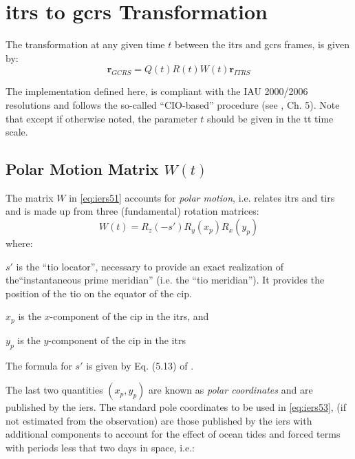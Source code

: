 \section{\gls{itrs} to \gls{gcrs} Transformation}\label{sec:itrs-to-gcrs}
The transformation at any given time $t$ between the \gls{itrs} and \gls{gcrs} 
frames, is given by:
\begin{equation}\label{eq:iers51}
  \bm{r}_{GCRS} = Q(t) R(t) W(t) \bm{r}_{ITRS}
\end{equation}

The implementation defined here, is compliant with the IAU 2000/2006 resolutions and 
follows the so-called ``CIO-based'' procedure (see \cite{iers2010}, Ch. 5).
Note that except if otherwise noted, the parameter $t$ should be given in the 
\gls{tt} time scale.

\subsection{Polar Motion Matrix $W(t)$}\label{ssec:polar-motion-matrix}
The matrix $W$ in \autoref{eq:iers51} accounts for \emph{polar motion}, i.e. relates 
\gls{itrs} and \gls{tirs} and is made up from three (fundamental) rotation matrices:
\begin{equation}\label{eq:iers53}
  W(t) = R_z (-s') R_y (x_{p}) R_x (y_{p})
\end{equation}
where:
\begin{description}
  \item $s'$ is the ``\gls{tio} locator'', necessary to provide an exact realization 
    of the``instantaneous prime meridian'' (i.e. the ``\gls{tio} meridian''). It provides 
    the position of the \gls{tio} on the equator of the \gls{cip}.
  \item $x_p$ is the $x$-component of the \gls{cip} in the \gls{itrs}, and
  \item $y_p$ is the $y$-component of the \gls{cip} in the \gls{itrs}
\end{description}

The formula for $s'$ is given by Eq. (5.13) of \cite{iers2010}.

The last two quantities $(x_p , y_p)$ are known as \emph{polar coordinates} and are 
published by the \gls{iers}. The standard pole coordinates to be used in \autoref{eq:iers53}, 
(if not estimated from the observation) are those published by the \gls{iers} with
additional components to account for the effect of ocean tides and forced terms 
with periods less that two days in space, i.e.:

